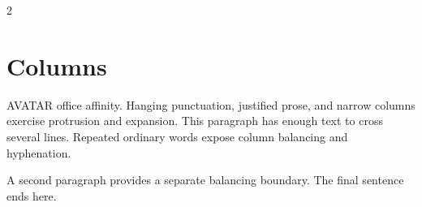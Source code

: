 \documentclass{article}\listfiles\usepackage{microtype,multicol}
\begin{document}
\begin{multicols}{2}
\section{Columns}
AVATAR office affinity. Hanging punctuation, justified prose, and narrow columns exercise protrusion and expansion. This paragraph has enough text to cross several lines. Repeated ordinary words expose column balancing and hyphenation.\par
A second paragraph provides a separate balancing boundary. The final sentence ends here.
\end{multicols}
\end{document}
